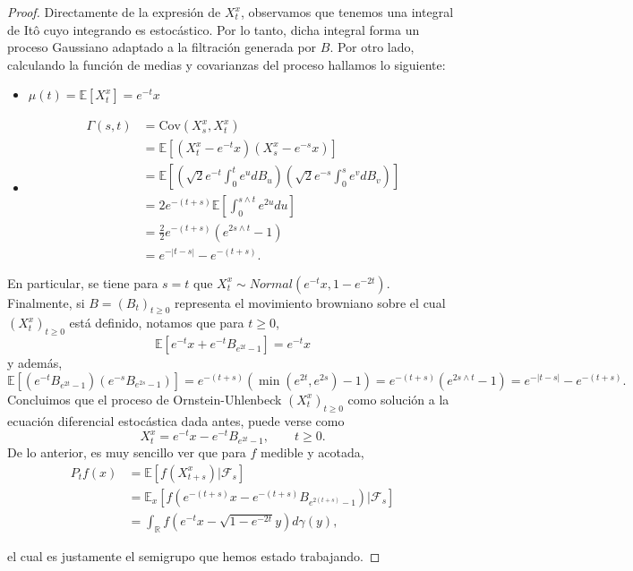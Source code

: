 \documentclass[letterpaper,twoside,12pt]{book}
\newcommand{\R}{\mathbb{R}}
\newcommand{\F}{\mathcal{F}}
\newcommand{\E}{\mathbb{E}}
\newcommand{\1}{\mathds{1}}
\theoremstyle{definition}
\theoremstyle{definition}
\theoremstyle{remark}
\theoremstyle{definition}
\theoremstyle{definition}
\theoremstyle{definition}
\theoremstyle{definition}
\theoremstyle{definition}
\begin{document}
\begin{proof}
     Directamente de la expresión de $X_t^{x}$, observamos que tenemos una integral de Itô cuyo integrando es estocástico. Por lo tanto, dicha integral forma un proceso Gaussiano adaptado a la filtración generada por $B$. Por otro lado, calculando la función de medias y covarianzas del proceso hallamos lo siguiente:
     \begin{itemize}
        \item $\mu(t)=\E\left[X_t^{x}\right]=e^{-t}x$
        \item \begin{align*}\Gamma(s,t)&=\text{Cov}\left(X_s^x,X_t^x\right)\\
            &=\E\left[\left(X_t^{x}-e^{-t}x\right)\left(X_s^x-e^{-s}x\right)\right]\\
            &=\E\left[\left(\sqrt{2}e^{-t}\int_{0}^{t}e^{u}dB_u\right)\left(\sqrt{2}e^{-s}\int_{0}^{s}e^{v}dB_v\right)\right]\\
            &=2e^{-(t+s)}\E\left[\int_{0}^{s\wedge t}e^{2u}du\right]\\
            &=\frac{2}{2}e^{-(t+s)}(e^{2s\wedge t}-1)\\
            &=e^{-|t-s|}-e^{-(t+s)}.
        \end{align*}
     \end{itemize}
     En particular, se tiene para $s=t$ que $X_t^x\sim Normal(e^{-t}x,1-e^{-2t})$. Finalmente, si $B=(B_t)_{t\geq0}$ representa el movimiento browniano sobre el cual $(X_t^x)_{t\geq0}$ está definido, notamos que para $t\geq0$,
     \[
     \E\left[e^{-t}x+e^{-t}B_{e^{2t}-1}\right]=e^{-t}x
     \]
     y además, 
     \[
     \E\left[\left(e^{-t}B_{e^{2t}-1}\right) \left(e^{-s}B_{e^{2s}-1}\right)\right]=e^{-(t+s)}(\min(e^{2t},e^{2s})-1)=e^{-(t+s)}(e^{2s\wedge t}-1)=e^{-|t-s|}-e^{-(t+s)}.
     \]
     Concluimos que el proceso de Ornstein-Uhlenbeck $(X_t^{x})_{t\geq0}$ como solución a la ecuación diferencial estocástica dada antes, puede verse como 
     \[
        X_t^{x}=e^{-t}x-e^{-t}B_{e^{2t}-1}, \qquad t\geq0.
     \]
     De lo anterior, es muy sencillo ver que para $f$ medible y acotada, 
     \begin{align*}
      P_tf(x)&=\E\left[f(X_{t+s}^{x})|\F_s\right]\\
      &=\E_x\left[f(e^{-(t+s)}x-e^{-(t+s)}B_{e^{2(t+s)}-1})|\F_s\right]\\
      &=\int_\R f \left(e^{-t}x-\sqrt{1-e^{-2t}}y\right)d\gamma(y),
     \end{align*}
     
     el cual es justamente el semigrupo que hemos estado trabajando.
   \end{proof}
\end{document}
